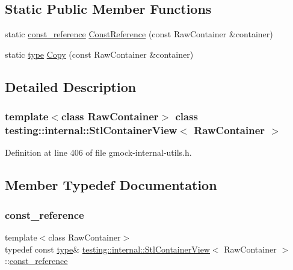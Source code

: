 \subsection*{Static Public Member Functions}
\begin{DoxyCompactItemize}
\item 
static \hyperlink{classtesting_1_1internal_1_1StlContainerView_a9cd4f6ed689b3938cdb7b3c4cbf1b36b}{const\+\_\+reference} \hyperlink{classtesting_1_1internal_1_1StlContainerView_a36eccf53329730f6e55c12002128bf25}{Const\+Reference} (const Raw\+Container \&container)
\item 
static \hyperlink{classtesting_1_1internal_1_1StlContainerView_a2b2c63a6dcdbfe63fb0ee121ebf463ba}{type} \hyperlink{classtesting_1_1internal_1_1StlContainerView_a441123838221f1284873f66ed968f279}{Copy} (const Raw\+Container \&container)
\end{DoxyCompactItemize}


\subsection{Detailed Description}
\subsubsection*{template$<$class Raw\+Container$>$\newline
class testing\+::internal\+::\+Stl\+Container\+View$<$ Raw\+Container $>$}



Definition at line 406 of file gmock-\/internal-\/utils.\+h.



\subsection{Member Typedef Documentation}
\mbox{\label{classtesting_1_1internal_1_1StlContainerView_a9cd4f6ed689b3938cdb7b3c4cbf1b36b}} 
\subsubsection{\texorpdfstring{const\+\_\+reference}{const\_reference}}
{\footnotesize\ttfamily template$<$class Raw\+Container$>$ \\
typedef const \hyperlink{classtesting_1_1internal_1_1StlContainerView_a2b2c63a6dcdbfe63fb0ee121ebf463ba}{type}\& \hyperlink{classtesting_1_1internal_1_1StlContainerView}{testing\+::internal\+::\+Stl\+Container\+View}$<$ Raw\+Container $>$\+::\hyperlink{classtesting_1_1internal_1_1StlContainerView_a9cd4f6ed689b3938cdb7b3c4cbf1b36b}{const\+\_\+reference}}




